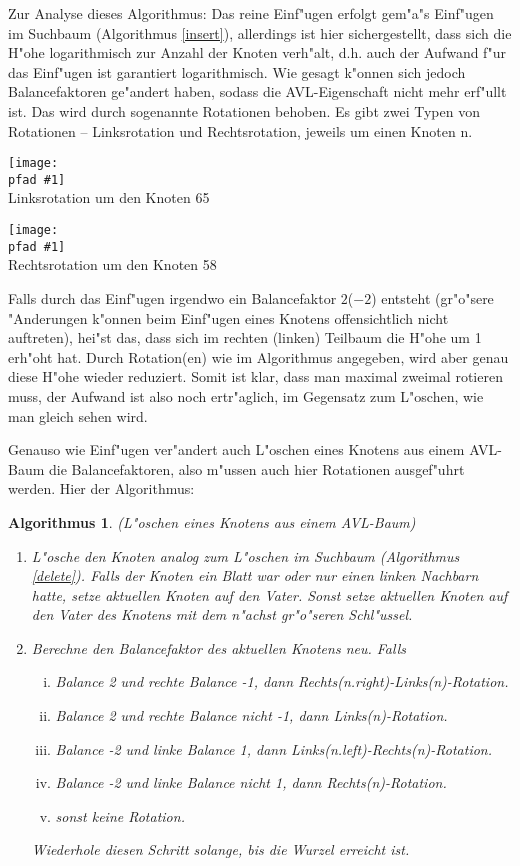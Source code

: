 \documentclass[a4paper,titlepage]{article}
\newtheorem{alg}{Algorithmus}
\newcommand{\pfad}{../pics/}
\newcommand{\centerpic}[3]{
	\begin{center}
		\texttt{[image: \\pfad \#1]} \\
		{\small #3}
	\end{center}
}
\begin{document}
\begin{appendix}
Zur Analyse dieses Algorithmus: Das reine Einf"ugen erfolgt
gem"a"s Einf"ugen im Suchbaum (Algorithmus \ref{insert}),
allerdings ist hier sichergestellt, dass sich die H"ohe
logarithmisch zur Anzahl der Knoten verh"alt, d.h. auch der
Aufwand f"ur das Einf"ugen ist garantiert logarithmisch. Wie
gesagt k"onnen sich jedoch Balancefaktoren ge"andert haben, sodass
die AVL-Eigenschaft nicht mehr erf"ullt ist. Das wird durch
sogenannte Rotationen behoben. Es gibt zwei Typen von Rotationen
-- Linksrotation und Rechtsrotation, jeweils um einen Knoten n. 

\centerpic{rotateleft}{5}{Linksrotation um den Knoten 65}  \medskip
\centerpic{rotateright}{5}{Rechtsrotation um den Knoten 58}  \medskip


Falls durch das Einf"ugen irgendwo ein Balancefaktor $2$($-2$)
entsteht (gr"o"sere "Anderungen k"onnen beim Einf"ugen eines
Knotens offensichtlich nicht auftreten), hei"st das, dass sich im
rechten (linken) Teilbaum die H"ohe um 1 erh"oht hat. Durch
Rotation(en) wie im Algorithmus angegeben, wird aber genau diese
H"ohe wieder reduziert. Somit ist klar, dass man maximal zweimal
rotieren muss, der Aufwand ist also noch ertr"aglich, im Gegensatz
zum L"oschen, wie man gleich sehen wird.

Genauso wie Einf"ugen ver"andert auch L"oschen eines Knotens aus
einem AVL-Baum die Balancefaktoren, also m"ussen auch hier
Rotationen ausgef"uhrt werden. Hier der Algorithmus:

\begin{alg} \label{avldelete}
(L"oschen eines Knotens aus einem AVL-Baum)
\begin{enumerate}
\item L"osche den Knoten analog zum L"oschen im Suchbaum
(Algorithmus \ref{delete}). Falls der Knoten ein Blatt war oder
nur einen linken Nachbarn hatte, setze aktuellen Knoten auf den
Vater. Sonst setze aktuellen Knoten auf den Vater des Knotens mit
dem n"achst gr"o"seren Schl"ussel. 

\item Berechne den Balancefaktor
des aktuellen Knotens neu. Falls
    \begin{enumerate}[(i)]
    \item Balance 2 und rechte Balance -1, dann
    Rechts(n.right)-Links(n)-Rotation.
    \item Balance 2 und rechte Balance nicht -1, dann
    Links(n)-Rotation.
    \item Balance -2 und linke Balance 1, dann
    Links(n.left)-Rechts(n)-Rotation.
    \item Balance -2 und linke Balance nicht 1, dann
    Rechts(n)-Rotation.
    \item sonst keine Rotation.
    \end{enumerate}
    Wiederhole diesen Schritt solange, bis die Wurzel erreicht
    ist.
\end{enumerate}
\end{alg}


\end{appendix}
\end{document}
